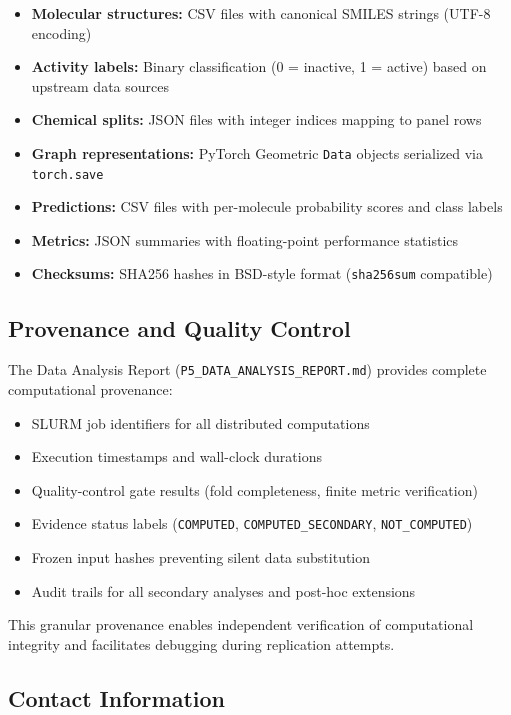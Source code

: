 \documentclass[11pt,a4paper]{article}
\begin{document}
\begin{itemize}[leftmargin=*,itemsep=0.3em]
\item \textbf{Molecular structures:} CSV files with canonical SMILES strings (UTF-8 encoding)
\item \textbf{Activity labels:} Binary classification (0 = inactive, 1 = active) based on upstream data sources
\item \textbf{Chemical splits:} JSON files with integer indices mapping to panel rows
\item \textbf{Graph representations:} PyTorch Geometric \texttt{Data} objects serialized via \texttt{torch.save}
\item \textbf{Predictions:} CSV files with per-molecule probability scores and class labels
\item \textbf{Metrics:} JSON summaries with floating-point performance statistics
\item \textbf{Checksums:} SHA256 hashes in BSD-style format (\texttt{sha256sum} compatible)
\end{itemize}

\subsection*{Provenance and Quality Control}

The Data Analysis Report (\texttt{P5\_DATA\_ANALYSIS\_REPORT.md}) provides complete computational provenance:

\begin{itemize}[leftmargin=*,itemsep=0.3em]
\item SLURM job identifiers for all distributed computations
\item Execution timestamps and wall-clock durations
\item Quality-control gate results (fold completeness, finite metric verification)
\item Evidence status labels (\texttt{COMPUTED}, \texttt{COMPUTED\_SECONDARY}, \texttt{NOT\_COMPUTED})
\item Frozen input hashes preventing silent data substitution
\item Audit trails for all secondary analyses and post-hoc extensions
\end{itemize}

\noindent This granular provenance enables independent verification of computational integrity and facilitates debugging during replication attempts.

\subsection*{Contact Information}
\end{document}
